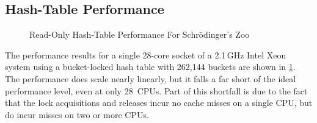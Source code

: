 \subsection{Hash-Table Performance}
\label{sec:datastruct:Hash-Table Performance}

\begin{figure}
\centering
{}
\caption{Read-Only Hash-Table Performance For Schr\"odinger's Zoo}
\label{fig:datastruct:Read-Only Hash-Table Performance For Schroedinger's Zoo}
\end{figure}

The performance results for a single 28-core socket of a 2.1\,GHz
Intel Xeon system using a bucket-locked hash table
with 262,144 buckets are shown in
\cref{fig:datastruct:Read-Only Hash-Table Performance For Schroedinger's Zoo}.
The performance does scale nearly linearly, but it falls a far short
of the ideal performance level, even at only 28~CPUs.
Part of this shortfall is due to the fact that the lock acquisitions and
releases incur no cache misses on a single CPU, but do incur misses
on two or more CPUs.

